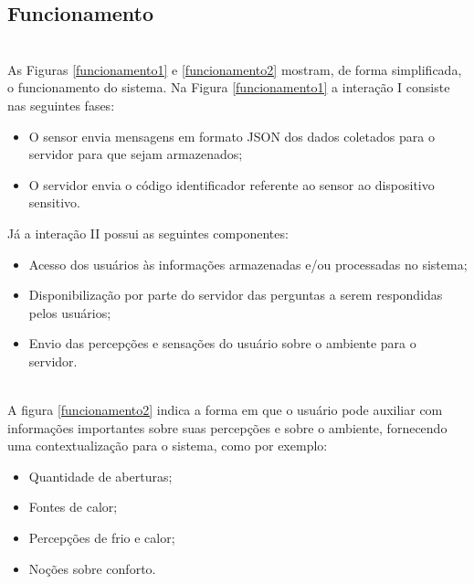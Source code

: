 \subsection{Funcionamento}
\\\null \quad As Figuras \ref{funcionamento1} e \ref{funcionamento2} mostram, de forma simplificada, o funcionamento do sistema. Na Figura \ref{funcionamento1} a interação I consiste nas seguintes fases:

\begin{itemize}
  \item O sensor envia mensagens em formato JSON dos dados coletados para o servidor para que sejam armazenados;
  \item O servidor envia o código identificador referente ao sensor ao dispositivo sensitivo.
\end{itemize}

Já a interação II possui as seguintes componentes:
\begin{itemize}
  \item Acesso dos usuários às informações armazenadas e/ou processadas no sistema;
  \item Disponibilização por parte do servidor das perguntas a serem respondidas pelos usuários;
  \item Envio das percepções e sensações do usuário sobre o ambiente para o servidor.
\end{itemize}


\\\null \quad A figura \ref{funcionamento2} indica a forma em que o usuário pode auxiliar com informações importantes sobre suas percepções e sobre o ambiente, fornecendo uma contextualização para o sistema, como por exemplo:
\begin{itemize}
  \item Quantidade de aberturas;
  \item Fontes de calor;
  \item Percepções de frio e calor;
  \item Noções sobre conforto.
\end{itemize}


